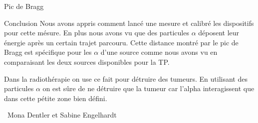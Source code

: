 \documentclass[a4paper,11pt]{scrartcl}
\begin{document}
 \begin{section}{Pic de Bragg}
  
 \end{section}

 
 \begin{section}{Conclusion}
  Nous avons appris comment lancé une mesure et calibré les dispositifs pour cette mésure. En plus nous avons vu que des particules $\alpha$ déposent leur énergie après un certain trajet parcouru. Cette distance montré par le pic de Bragg est spécifique pour les $\alpha$ d'une source comme nous avons vu en comparaisant les deux sources disponibles pour la TP.
  
  Dans la radiothérapie on use ce fait pour détruire des tumeurs. En utilisant des particules $\alpha$ on est sûre de ne détruire que la tumeur car l'alpha interagissent que dans cette pétite zone bien défini.
 \end{section}

 \vspace{1cm}
 \begin{flushright}
  \titlefont \textcopyleft\ Mona Dentler et Sabine Engelhardt
 \end{flushright}
\end{document}
